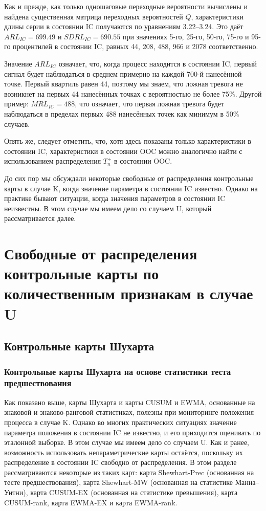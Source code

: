 Как и прежде, как только одношаговые переходные вероятности вычислены и найдена существенная матрица переходных вероятностей \(Q\), характеристики длины серии в состоянии IC получаются по уравнениям 3.22--3.24. Это даёт \(ARL_{IC} = 699.49\) и \(SDRL_{IC} = 690.55\) при значениях 5-го, 25-го, 50-го, 75-го и 95-го процентилей в состоянии IC, равных 44, 208, 488, 966 и 2078 соответственно.

Значение \(ARL_{IC}\) означает, что, когда процесс находится в состоянии IC, первый сигнал будет наблюдаться в среднем примерно на каждой 700-й нанесённой точке. Первый квартиль равен 44, поэтому мы знаем, что ложная тревога не возникнет на первых 44 нанесённых точках с вероятностью не более 75\%. Другой пример: \(MRL_{IC} = 488\), что означает, что первая ложная тревога будет наблюдаться в пределах первых 488 нанесённых точек как минимум в 50\% случаев.

Опять же, следует отметить, что, хотя здесь показаны только характеристики в состоянии IC, характеристики в состоянии OOC можно аналогично найти с использованием распределения \(T_n^+\) в состоянии OOC.

До сих пор мы обсуждали некоторые свободные от распределения контрольные карты в случае K, когда значение параметра в состоянии IC известно. Однако на практике бывают ситуации, когда значения параметров в состоянии IC неизвестны. В этом случае мы имеем дело со случаем U, который рассматривается далее.

\section{Свободные от распределения контрольные карты по количественным признакам в случае U}

\subsection{Контрольные карты Шухарта}
\subsubsection{Контрольные карты Шухарта на основе статистики теста предшествования}
Как показано выше, карты Шухарта и карты CUSUM и EWMA, основанные на знаковой и знаково-ранговой статистиках, полезны при мониторинге положения процесса в случае K. Однако во многих практических ситуациях значение параметра положения в состоянии IC не известно, и его приходится оценивать по эталонной выборке. В этом случае мы имеем дело со случаем U. Как и ранее, возможность использовать непараметрические карты остаётся, поскольку их распределение в состоянии IC свободно от распределения. В этом разделе рассматриваются некоторые из таких карт: карта Shewhart-Prec (основанная на тесте предшествования), карта Shewhart-MW (основанная на статистике Манна--Уитни), карта CUSUM-EX (основанная на статистике превышения), карта CUSUM-rank, карта EWMA-EX и карта EWMA-rank.

